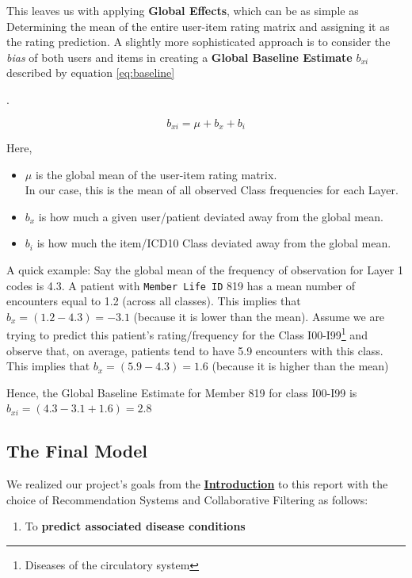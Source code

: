 \documentclass[twoside,11pt]{article}
\newcommand*\circled[1]{\tikz[baseline=(char.base)]{
            \node[shape=circle,draw,inner sep=1pt] (char) {#1};}}
\begin{document}
This leaves us with applying \textbf{Global Effects}, which can be as simple as \circled{1} Determining the mean of the entire user-item rating matrix and \circled{2} assigning it as the rating prediction.
\newpage
A slightly more sophisticated approach is to consider the \textit{bias} of both users and items in creating a \textbf{Global Baseline Estimate} $b_{xi}$ described by equation \ref{eq:baseline}{.

\begin{equation}
  b_{xi} = \mu + b_x + b_i
  \label{eq:baseline}
\end{equation}

Here,
\begin{itemize}
  \item $\mu$ is the global mean of the user-item rating matrix. \\In our case, this is the mean of all observed Class frequencies for each Layer.
  \item $b_x$ is how much a given user/patient deviated away from the global mean.
  \item $b_i$ is how much the item/ICD10 Class deviated away from the global mean.
\end{itemize}

A quick example: Say the global mean of the frequency of observation for Layer 1 codes is 4.3. A patient with \texttt{Member Life ID} 819 has a mean number of encounters equal to 1.2 (across all classes). This implies that $b_x = (1.2 - 4.3) = -3.1$ (because it is lower than the mean). Assume we are trying to predict this patient's rating/frequency for the Class I00-I99\footnote{Diseases of the circulatory system} and observe that, on average,  patients tend to have 5.9 encounters with this class. This implies that $b_x = (5.9 - 4.3) = 1.6$ (because it is higher than the mean)

Hence, the Global Baseline Estimate for Member 819 for class I00-I99 is $b_{xi} = (4.3 - 3.1 + 1.6) = 2.8$


\subsection{The Final Model}

We realized our project's goals from the \hyperref[section:introduction]{\textbf{Introduction}} to this report with the choice of Recommendation Systems and Collaborative Filtering as follows:
\begin{enumerate}
  \item To \textbf{predict associated disease conditions}


\end{enumerate}}
\end{document}
